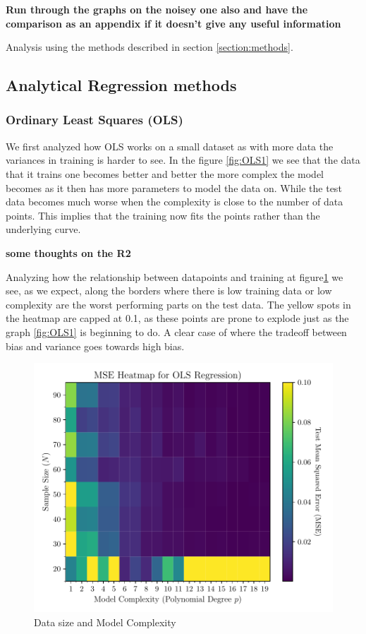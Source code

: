 \documentclass[amssymb,twocolumn,aps]{revtex4}
\begin{document}
\textbf{Run through the graphs on the noisey one also and have the comparison as an appendix if it doesn't give any useful information}


Analysis using the methods described in section \ref{section:methods}.

\subsection{Analytical Regression methods}

\subsubsection{Ordinary Least Squares (OLS)}



We first analyzed how OLS works on a small dataset as with more data the variances in training is harder to see. In the figure \ref{fig:OLS1} we see that the data that it trains one becomes better and better the more complex the model becomes as it then has more parameters to model the data on. While the test data becomes much worse when the complexity is close to the number of data points. This implies that the training now fits the points rather than the underlying curve.

\textbf{some thoughts on the R2}


Analyzing how the relationship between datapoints and training at figure\ref{fig:OLSHeat} we see, as we expect, along the borders where there is low training data or low complexity are the worst performing parts on the test data. The yellow spots in the heatmap are capped at 0.1, as these points are prone to explode just as the graph \ref{fig:OLS1} is beginning to do.
A clear case of where the tradeoff between bias and variance goes towards high bias.

\begin{figure}[H]
    \centering
    \includegraphics[width=.95 \linewidth]{Figures/OLS_Heatmap.pdf}
    \caption{Data size and Model Complexity}
    \label{fig:OLSHeat}
\end{figure}
\end{document}
